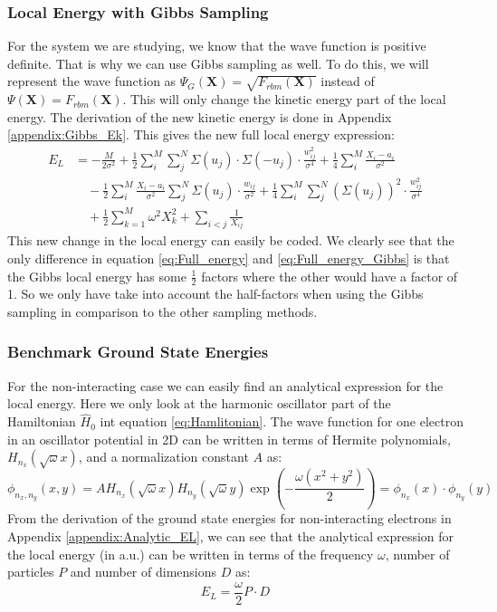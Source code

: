 \documentclass[12pt,a4paper,english]{article}
\begin{document}
\subsubsection{Local Energy with Gibbs Sampling}
\label{subsubsect:Gibbs_EL}
For the system we are studying, we know that the wave function is positive definite. That is why we can use Gibbs sampling as well. To do this, we will represent the wave function as $\Psi_G(\textbf{X})=\sqrt{F_{rbm}(\textbf{X})}$ instead of $\Psi(\textbf{X})=F_{rbm}(\textbf{X})$. This will only change the kinetic energy part of the local energy. The derivation of the new kinetic energy is done in Appendix \ref{appendix:Gibbs_Ek}. This gives the new full local energy expression:
\begin{align}
\label{eq:Full_energy_Gibbs}
E_L&=-\frac{M}{2\sigma^2} +\frac{1}{2}\sum_{i}^{M}\sum_{j}^{N}\Sigma(u_j)\cdot\Sigma(-u_j)\cdot\frac{w_{ij}^2}{\sigma^4} +\frac{1}{4}\sum_{i}^{M}\frac{X_i-a_i}{\sigma^2}\nonumber\\ 
&\quad -\frac{1}{2}\sum_{i}^{M}\frac{X_i-a_i}{\sigma^2}\sum_{j}^{N}\Sigma(u_j)\cdot\frac{w_{ij}}{\sigma^2} 
+\frac{1}{4}\sum_{i}^{M}\sum_{j}^{N}(\Sigma(u_j))^2\cdot\frac{w_{ij}^2}{\sigma^4}\nonumber\\
&\quad +\frac{1}{2}\sum_{k=1}^{M}\omega^2X_k^2 + \sum_{i<j}\frac{1}{X_{ij}}
\end{align}
This new change in the local energy can easily be coded. We clearly see that the only difference in equation \ref{eq:Full_energy} and \ref{eq:Full_energy_Gibbs} is that the Gibbs local energy has some $\frac{1}{2}$ factors where the other would have a factor of 1. So we only have take into account the half-factors when using the Gibbs sampling in comparison to the other sampling methods.

\subsubsection{Benchmark Ground State Energies}
\label{subsubsect:Analytical E_L}
For the non-interacting case we can easily find an analytical expression for the local energy. Here we only look at the harmonic oscillator part of the Hamiltonian $\hat{H}_0$ int equation \ref{eq:Hamlitonian}. The wave function for one electron in an oscillator potential in 2D can be written in terms of Hermite polynomials, $H_{n_x}(\sqrt{\omega}x)$, and a normalization constant $A$ as:
\begin{equation}
\label{eq:simple_wf}
\phi_{n_x,n_y}(x,y)=AH_{n_x}(\sqrt{\omega}x)H_{n_y}(\sqrt{\omega}y)\exp\left(-\frac{\omega(x^2+y^2)}{2}\right)=\phi_{n_x}(x)\cdot\phi_{n_y}(y)
\end{equation}
From the derivation of the ground state energies for non-interacting electrons in Appendix \ref{appendix:Analytic_EL}, we can see that the analytical expression for the local energy (in a.u.) can be written in terms of the frequency $\omega$, number of particles $P$ and number of dimensions $D$ as:
\begin{equation}
\label{eq:analytic_EL}
E_L=\frac{\omega}{2}P\cdot D
\end{equation}
\end{document}
